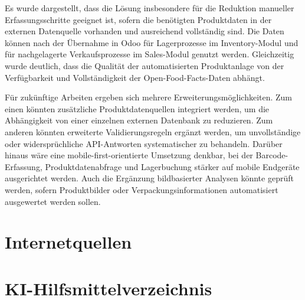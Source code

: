 \documentclass[12pt,a4paper]{article}
\begin{document}
Es wurde dargestellt, dass die Lösung insbesondere für die Reduktion manueller Erfassungsschritte geeignet ist, sofern die benötigten Produktdaten in der externen Datenquelle vorhanden und ausreichend vollständig sind. Die Daten können nach der Übernahme in Odoo für Lagerprozesse im Inventory-Modul und für nachgelagerte Verkaufsprozesse im Sales-Modul genutzt werden. Gleichzeitig wurde deutlich, dass die Qualität der automatisierten Produktanlage von der Verfügbarkeit und Vollständigkeit der Open-Food-Facts-Daten abhängt.

Für zukünftige Arbeiten ergeben sich mehrere Erweiterungsmöglichkeiten. Zum einen könnten zusätzliche Produktdatenquellen integriert werden, um die Abhängigkeit von einer einzelnen externen Datenbank zu reduzieren. Zum anderen könnten erweiterte Validierungsregeln ergänzt werden, um unvollständige oder widersprüchliche API-Antworten systematischer zu behandeln. Darüber hinaus wäre eine mobile-first-orientierte Umsetzung denkbar, bei der Barcode-Erfassung, Produktdatenabfrage und Lagerbuchung stärker auf mobile Endgeräte ausgerichtet werden. Auch die Ergänzung bildbasierter Analysen könnte geprüft werden, sofern Produktbilder oder Verpackungsinformationen automatisiert ausgewertet werden sollen.


\newpage
{}
{}
\lstlistoflistings
\newpage
\printbibliography[
    heading=bibintoc,
    title={Literaturverzeichnis},
    notkeyword=internet
]

\newpage
\section*{Internetquellen}

\printbibliography[
    heading=none,
    keyword=internet
]

\newpage
\section*{KI-Hilfsmittelverzeichnis}

\renewcommand{\arraystretch}{0.92}
\noindent\small
\setlength{\tabcolsep}{2pt}
\end{document}
